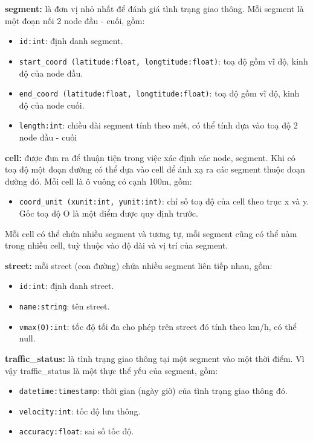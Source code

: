 \textbf{segment:} là đơn vị nhỏ nhất để đánh giá tình trạng giao thông. Mỗi segment là một đoạn nối 2 node đầu - cuối, gồm:
\begin{itemize}
    \item \lstinline{id:int}: định danh segment.
    \item \lstinline{start_coord (latitude:float, longtitude:float)}: toạ độ gồm vĩ độ, kinh độ của node đầu.
    \item \lstinline{end_coord (latitude:float, longtitude:float)}: toạ độ gồm vĩ độ, kinh độ của node cuối.
    \item \lstinline{length:int}: chiều dài segment tính theo mét, có thể tính dựa vào toạ độ 2 node đầu - cuối\\
\end{itemize}

\textbf{cell:} được đưa ra để thuận tiện trong việc xác định các node, segment. Khi có toạ độ một đoạn đường có thể dựa vào cell để ánh xạ ra các segment thuộc đoạn đường đó. Mỗi cell là ô vuông có cạnh 100m, gồm:
\begin{itemize}
    \item \lstinline{coord_unit (xunit:int, yunit:int)}: chỉ số toạ độ của cell theo trục x và y. Gốc toạ độ O là một điểm được quy định trước.\\
\end{itemize}
Mỗi cell có thể chứa nhiều segment và tương tự, mỗi segment cũng có thể nàm trong nhiều cell, tuỳ thuộc vào độ dài và vị trí của segment.

\textbf{street:} mỗi street (con đường) chứa nhiều segment liên tiếp nhau, gồm:
\begin{itemize}
    \item \lstinline{id:int}: định danh street.
    \item \lstinline{name:string}: tên street.
    \item \lstinline{vmax(O):int}: tốc độ tối đa cho phép trên street đó tính theo km/h, có thể null.\\
\end{itemize}

\textbf{traffic\_status:} là tình trạng giao thông tại một segment vào một thời điểm. Vì vậy traffic\_status là một thực thể yếu của segment, gồm:
\begin{itemize}
    \item \lstinline{datetime:timestamp}: thời gian (ngày giờ) của tình trạng giao thông đó.
    \item \lstinline{velocity:int}: tốc độ lưu thông.
    \item \lstinline{accuracy:float}: sai số tốc độ.\\
\end{itemize}

